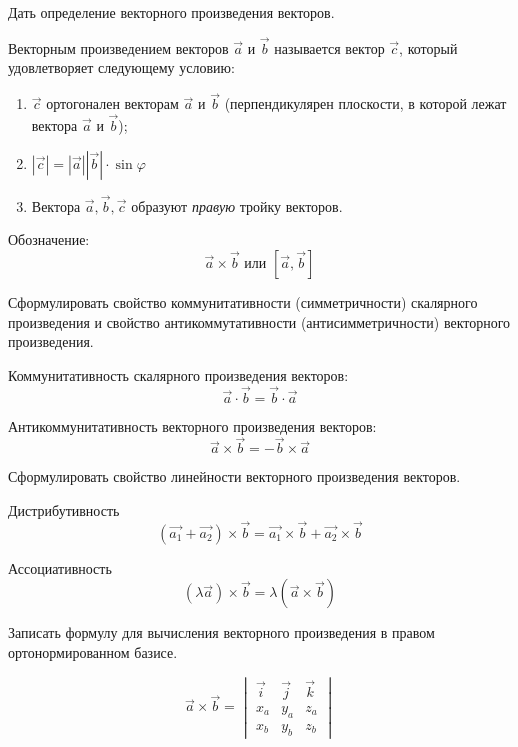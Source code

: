 \begin{question}
  Дать определение векторного произведения векторов.
\end{question}
\begin{answer}
  Векторным произведением векторов $\vec{a}$ и $\vec{b}$ называется вектор $\vec{c}$, который удовлетворяет следующему условию:
  \begin{enumerate}
    \item $\vec{c}$ ортогонален векторам $\vec{a}$ и $\vec{b}$ (перпендикулярен плоскости, в которой лежат вектора $\vec{a}$ и $\vec{b}$);
    \item $|\vec{c}| = |\vec{a}| |\vec{b}| \cdot \sin \varphi$
    \item Вектора $\vec{a}, \vec{b}, \vec{c}$ образуют \textit{правую} тройку векторов.
  \end{enumerate}
  Обозначение: \[
    \vec{a} \times \vec{b} \text{ или } [\vec{a}, \vec{b}]
  \]   
\end{answer}

\begin{question}
  Сформулировать свойство коммунитативности (симметричности) скалярного произведения и свойство антикоммутативности (антисимметричности) векторного произведения.
\end{question}
\begin{answer}
  Коммунитативность скалярного произведения векторов: \[
    \vec{a} \cdot \vec{b} = \vec{b} \cdot \vec{a}
  \] 

  Антикоммунитативность векторного произведения векторов: \[
    \vec{a} \times \vec{b} = - \vec{b} \times \vec{a}  
  \] 
\end{answer}

\begin{question}
  Сформулировать свойство линейности векторного произведения векторов.
\end{question}
\begin{answer}
  Дистрибутивность \[
    (\vec{a_1} + \vec{a_2}) \times \vec{b} = \vec{a_1} \times \vec{b} + \vec{a_2} \times  \vec{b} 
  \]  

  Ассоциативность \[
    (\lambda \vec{a}) \times \vec{b} = \lambda (\vec{a} \times \vec{b})  
  \]  
\end{answer}

\begin{question}
  Записать формулу для вычисления векторного произведения в правом ортонормированном базисе.
\end{question}
\begin{answer}
  \[
  \vec{a} \times \vec{b} = 
  \begin{vmatrix}
    \vec{i} & \vec{j} & \vec{k} \\
    x_a & y_a & z_a \\
    x_b & y_b & z_b 
  \end{vmatrix}
  \] 
\end{answer}

